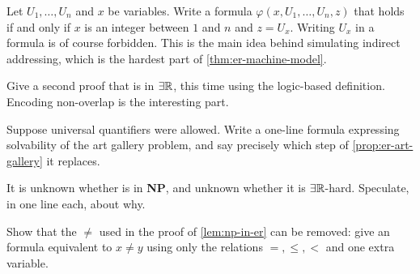 \begin{exercise}\label{ex:etr-indirect-addressing}
Let $U_1, \ldots, U_n$ and $x$ be variables. Write a formula
$\varphi(x, U_1, \ldots, U_n, z)$ that holds if and only if $x$ is an integer
between $1$ and $n$ and $z = U_x$. Writing $U_x$ in a formula is of course
forbidden. This is the main idea behind simulating indirect addressing, which is
the hardest part of \cref{thm:er-machine-model}.
\end{exercise}

\begin{exercise}
Give a second proof that  is in $\exists\mathbb{R}$, this time using
the logic-based definition. Encoding non-overlap is the interesting part.
\end{exercise}

\begin{exercise}
Suppose universal quantifiers were allowed. Write a one-line formula expressing
solvability of the art gallery problem, and say precisely which step of
\cref{prop:er-art-gallery} it replaces.
\end{exercise}

\begin{exercise}
It is unknown whether  is in \textbf{NP}, and unknown
whether it is $\exists\mathbb{R}$-hard. Speculate, in one line each, about why.
\end{exercise}

\begin{exercise}
Show that the $\ne$ used in the proof of \cref{lem:np-in-er} can be removed:
give an \ETR{} formula equivalent to $x \ne y$ using only the relations
$=, \le, <$ and one extra variable.
\end{exercise}
